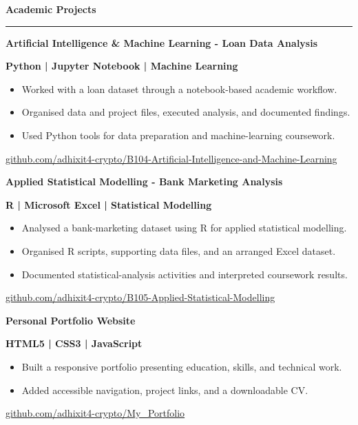 \documentclass[10pt,a4paper]{article}
\newcommand{\sectiontitle}[1]{%
  \vspace{7pt}
  {\color{DeepGreen}\large\bfseries #1}\par
  \vspace{2pt}
  {\color{Teal}\rule{\linewidth}{1.2pt}}\par
  \vspace{4pt}
}
\newcommand{\entrytitle}[1]{%
  {\color{DeepGreen}\normalsize\bfseries #1}\par
}
\newcommand{\entrymeta}[1]{%
  {\color{Teal}\small\bfseries #1}\par
}
\begin{document}
\vspace{4pt}
\begin{minipage}[t]{0.625\textwidth}
  \sectiontitle{Academic Projects}

  \entrytitle{Artificial Intelligence \& Machine Learning - Loan Data Analysis}
  \entrymeta{Python | Jupyter Notebook | Machine Learning}
  \begin{itemize}
    \small\color{BodyGray}
    \item Worked with a loan dataset through a notebook-based academic workflow.
    \item Organised data and project files, executed analysis, and documented findings.
    \item Used Python tools for data preparation and machine-learning coursework.
  \end{itemize}
  {\footnotesize\href{https://github.com/adhixit4-crypto/B104-Artificial-Intelligence-and-Machine-Learning}{github.com/adhixit4-crypto/B104-Artificial-Intelligence-and-Machine-Learning}}\par

  \vspace{6pt}
  \entrytitle{Applied Statistical Modelling - Bank Marketing Analysis}
  \entrymeta{R | Microsoft Excel | Statistical Modelling}
  \begin{itemize}
    \small\color{BodyGray}
    \item Analysed a bank-marketing dataset using R for applied statistical modelling.
    \item Organised R scripts, supporting data files, and an arranged Excel dataset.
    \item Documented statistical-analysis activities and interpreted coursework results.
  \end{itemize}
  {\footnotesize\href{https://github.com/adhixit4-crypto/B105-Applied-Statistical-Modelling}{github.com/adhixit4-crypto/B105-Applied-Statistical-Modelling}}\par

  \vspace{6pt}
  \entrytitle{Personal Portfolio Website}
  \entrymeta{HTML5 | CSS3 | JavaScript}
  \begin{itemize}
    \small\color{BodyGray}
    \item Built a responsive portfolio presenting education, skills, and technical work.
    \item Added accessible navigation, project links, and a downloadable CV.
  \end{itemize}
  {\footnotesize\href{https://github.com/adhixit4-crypto/My_Portfolio}{github.com/adhixit4-crypto/My\_Portfolio}}\par


\end{minipage}
\end{document}
